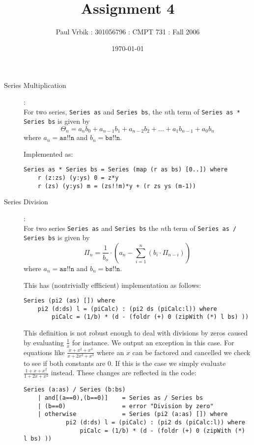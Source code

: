 \documentclass[12pt]{report}
\title{Assignment 4}
\author{Paul Vrbik : 301056796 : CMPT 731 : Fall 2006}
\date{\today}
\begin{document}
\maketitle

\begin{description}
\item[Series Multiplication]:\\
For two series, \texttt{Series as} and \texttt{Series bs}, the $n$th term of \texttt{Series as * Series bs} is given by $$\Theta_n = a_nb_0 + a_{n-1}b_1 + a_{n-2}b_2 + ... + a_1b_{n-1} + a_0b_n$$ where $a_n = \texttt{as!!n}$ and $b_n = \texttt{bs!!n}$. 

Implemented as:
\begin{verbatim}
Series as * Series bs = Series (map (r as bs) [0..]) where
    r (z:zs) (y:ys) 0 = z*y
    r (zs) (y:ys) m = (zs!!m)*y + (r zs ys (m-1))
\end{verbatim}

\item[Series Division]:\\
For two series \texttt{Series as} and \texttt{Series bs} the $n$th term of \texttt{Series as / Series bs} is given by $$ \Pi_n = \frac 1 {b_o} \cdot \left( a_n - \sum_{i=1}^n (b_i \cdot \Pi_{n-i}) \right) $$ where $a_n = \texttt{as!!n}$ and $b_n = \texttt{bs!!n}$. 

This has (nontrivially effficient) implementation as follows:
\begin{verbatim}
Series (pi2 (as) []) where
    pi2 (d:ds) l = (piCalc) : (pi2 ds (piCalc:l)) where
        piCalc = (1/b) * (d - (foldr (+) 0 (zipWith (*) l bs) ))
\end{verbatim}

This definition is not robust enough to deal with divisions by zeros caused by evaluating $\frac {1} {x}$ for instance. We output an exception in this case. For equations like $\frac {x+x^2+x^3} {x+2x^2+x^3}$ where an $x$ can be factored and cancelled we check to see if both constants are 0. If this is the case we simply evaluate $\frac {1+x+x^2} {1+2x+x^2}$ instead. These changes are reflected in the code:

\begin{verbatim}
Series (a:as) / Series (b:bs)
    | and[(a==0),(b==0)]    = Series as / Series bs
    | (b==0)                = error "Division by zero"
    | otherwise             = Series (pi2 (a:as) []) where
            pi2 (d:ds) l = (piCalc) : (pi2 ds (piCalc:l)) where
                piCalc = (1/b) * (d - (foldr (+) 0 (zipWith (*) l bs) ))
\end{verbatim}
\newpage


\end{description}
\end{document}
